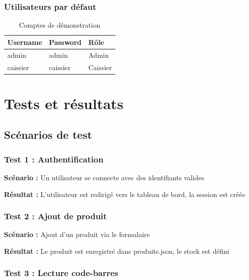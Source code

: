 \documentclass[12pt,a4paper,french]{report}
\begin{document}
\subsection{Utilisateurs par défaut}

\begin{table}[H]
\centering
\begin{tabular}{|l|l|l|}
\hline
\textbf{Username} & \textbf{Password} & \textbf{Rôle} \\
\hline
admin & admin & Admin \\
caissier & caissier & Caissier \\
\hline
\end{tabular}
\caption{Comptes de démonstration}
\end{table}

\chapter{Tests et résultats}

\section{Scénarios de test}

\subsection{Test 1 : Authentification}

\textbf{Scénario :} Un utilisateur se connecte avec des identifiants valides

\textbf{Résultat :} L'utilisateur est redirigé vers le tableau de bord, la session est créée

\subsection{Test 2 : Ajout de produit}

\textbf{Scénario :} Ajout d'un produit via le formulaire

\textbf{Résultat :} Le produit est enregistré dans produits.json, le stock est défini

\subsection{Test 3 : Lecture code-barres}
\end{document}
